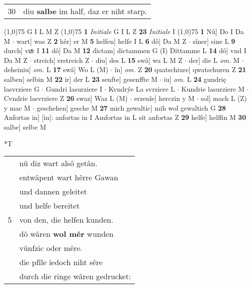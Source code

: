 \documentclass[8pt,a4paper,notitlepage]{article}
\begin{document}
\begin{table}[ht]
\begin{minipage}[t]{0.5\linewidth}
\begin{tabular}{rl}
30 & diu \textbf{salbe} im half, daz er niht starp.\\ 
\end{tabular}
\scriptsize
\line(1,0){75} \newline
G I L M Z \newline
\line(1,0){75} \newline
\textbf{1} \textit{Initiale} G I L Z  \textbf{23} \textit{Initiale} I  \newline
\line(1,0){75} \newline
\textbf{1} Nû] Do I Da M  $\cdot$ wart] was Z \textbf{2} hêr] er M \textbf{5} helfen] helfe I L \textbf{6} dô] Da M Z  $\cdot$ sîner] sine L \textbf{9} durch] vuͤr I \textbf{11} dô] Da M \textbf{12} dictam] dictammen G (I) Dittamme L \textbf{14} dô] vnd I Da M Z  $\cdot$ streich] erstreich Z  $\cdot$ diu] des L \textbf{15} swâ] wa L M Z  $\cdot$ der] die L \textit{om.} M  $\cdot$ deheiniu] \textit{om.} L \textbf{17} swâ] Wo L (M)  $\cdot$ în] \textit{om.} Z \textbf{20} quatschiure] qwatschuren Z \textbf{21} salben] selbin M \textbf{22} ir] der L \textbf{23} senfte] gesenffte M  $\cdot$ iu] \textit{om.} L \textbf{24} gundrię lasvrziere G  $\cdot$ Gundri lasurziere I  $\cdot$ Kvndrýe La svrziere L  $\cdot$ Kundrie lasurziere M  $\cdot$ Cvndrie lasvrziere Z \textbf{26} swaz] Waz L (M)  $\cdot$ erzenîe] herczin y M  $\cdot$ sol] mach L (Z) y mac M  $\cdot$ geschehen] gesche M \textbf{27} mich gewaltic] mih wol gewaltich G \textbf{28} Anfortas in] [in]: anfortas in I Amfortas in L sit anfortas Z \textbf{29} helfe] helffin M \textbf{30} salbe] selbe M \newline
\end{minipage}
\hspace{0.5cm}
\begin{minipage}[t]{0.5\linewidth}
\small
\begin{center}*T
\end{center}
\begin{tabular}{rl}
 & nû diz wart alsô getân.\\ 
 & entwâpent wart hêrre Gawan\\ 
 & und dannen geleitet\\ 
 & und helfe bereitet\\ 
5 & von den, die helfen kunden.\\ 
 & dô wâren \textbf{wol mêr} wunden\\ 
 & vünfzic oder mêre.\\ 
 & die pfîle iedoch niht sêre\\ 
 & durch die ringe wâren gedrucket:\\ 

\end{tabular}
\end{minipage}
\end{table}
\end{document}
